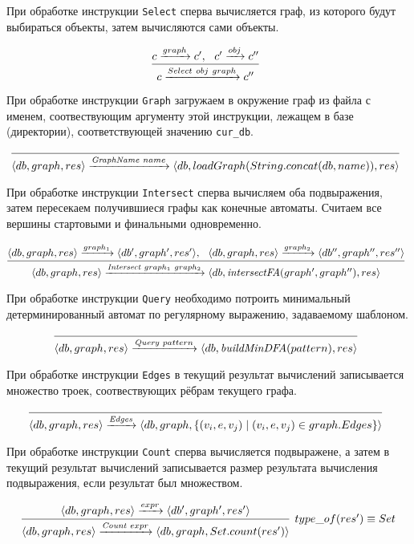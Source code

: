 При обработке инструкции \verb|Select| сперва вычисляется граф, из которого будут выбираться объекты, затем вычисляются сами объекты.

$$
\infer[]{c \xrightarrow{Select \ obj \ graph} c''}{c \xrightarrow{graph} c', \ \ c' \xrightarrow{obj} c''}
$$

При обработке инструкции \verb|Graph| загружаем в окружение граф из файла с именем, соотвествующим аргументу этой инструкции, лежащем в базе (директории), соответствующей значению \verb|cur_db|.

$$
\infer[]{\langle db, graph, res \rangle \xrightarrow{\textit{GraphName} \ name} \langle db ,loadGraph(String.concat(db,name)), res\rangle}{}
$$

При обработке инструкции \verb|Intersect| сперва вычисляем оба подвыражения, затем пересекаем получившиеся графы как конечные автоматы. Считаем все вершины стартовыми и финальными одновременно.

$$
\infer[]{\langle db, graph, res\rangle \xrightarrow{\textit{Intersect} \ graph_1 \ graph_2} \langle db, \textit{intersectFA}(graph', graph''), res\rangle}{\langle db, graph,res\rangle \xrightarrow{graph_1} \langle db', graph', res'\rangle, \ \ \langle db, graph,res\rangle \xrightarrow{graph_2} \langle db'', graph'', res''\rangle}
$$


При обработке инструкции \verb|Query| необходимо потроить минимальный детерминированный автомат по регулярному выражению, задаваемому шаблоном.

$$
\infer[]{\langle db, graph, res \rangle \xrightarrow{\textit{Query} \ pattern} \langle db, \textit{buildMinDFA}(pattern), res \rangle}{}
$$

При обработке инструкции \verb|Edges| в текущий результат вычислений записывается множество троек, соотвествующих рёбрам текущего графа.

$$
\infer[]{\langle db, graph, res \rangle \xrightarrow{\textit{Edges}} \langle db, graph, \{(v_i,e,v_j) \mid (v_i,e,v_j) \in graph.Edges\}\rangle}{}
$$

При обработке инструкции \verb|Count| сперва вычисляется подвыражене, а затем в текущий результат вычислений записывается размер результата вычисления подвыражения, если результат был множеством.

$$
\infer[type\_of(res') \equiv Set ]{\langle db, graph, res \rangle \xrightarrow{\textit{Count} \ expr} \langle db, graph, Set.count(res') \rangle}{\langle db, graph, res \rangle \xrightarrow{expr} \langle db', graph', res' \rangle}
$$

